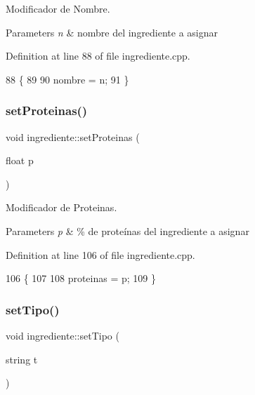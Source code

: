 Modificador de Nombre. 


\begin{DoxyParams}{Parameters}
{\em n} & nombre del ingrediente a asignar \\
\hline
\end{DoxyParams}


Definition at line 88 of file ingrediente.\+cpp.


\begin{DoxyCode}
88                                    \{
89 
90     nombre = n;
91 \}
\end{DoxyCode}
\mbox{\label{classingrediente_a5ee4fac5c35f8ff71e7f974d1675a626}} 
\subsubsection{\texorpdfstring{set\+Proteinas()}{setProteinas()}}
{\footnotesize\ttfamily void ingrediente\+::set\+Proteinas (\begin{DoxyParamCaption}\item[{float}]{p }\end{DoxyParamCaption})}



Modificador de Proteinas. 


\begin{DoxyParams}{Parameters}
{\em p} & \% de proteínas del ingrediente a asignar \\
\hline
\end{DoxyParams}


Definition at line 106 of file ingrediente.\+cpp.


\begin{DoxyCode}
106                                      \{
107 
108     proteinas = p;
109 \}
\end{DoxyCode}
\mbox{\label{classingrediente_ae51c71ad615844974ee24bb2fe9c7b80}} 
\subsubsection{\texorpdfstring{set\+Tipo()}{setTipo()}}
{\footnotesize\ttfamily void ingrediente\+::set\+Tipo (\begin{DoxyParamCaption}\item[{string}]{t }\end{DoxyParamCaption})}



